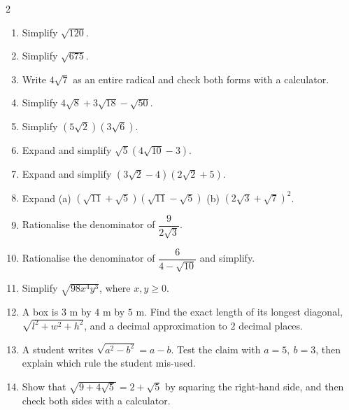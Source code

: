 \documentclass[11pt]{article}
\begin{document}
\begin{recapbox}
\begin{multicols}{2}
\small
\begin{enumerate}[leftmargin=*,itemsep=3pt]
  \item Simplify $\sqrt{120}$.
  \item Simplify $\sqrt{675}$.
  \item Write $4\sqrt7$ as an entire radical and check both forms with a calculator.
  \item Simplify $4\sqrt8+3\sqrt{18}-\sqrt{50}$.
  \item Simplify $(5\sqrt2)(3\sqrt6)$.
  \item Expand and simplify $\sqrt5\left(4\sqrt{10}-3\right)$.
  \item Expand and simplify $\left(3\sqrt2-4\right)\left(2\sqrt2+5\right)$.
  \item Expand (a) $\left(\sqrt{11}+\sqrt5\right)\left(\sqrt{11}-\sqrt5\right)$ \quad (b) $\left(2\sqrt3+\sqrt7\right)^2$.
  \item Rationalise the denominator of $\dfrac{9}{2\sqrt3}$.
  \item Rationalise the denominator of $\dfrac{6}{4-\sqrt{10}}$ and simplify.
  \item Simplify $\sqrt{98x^4y^3}$, where $x,y\ge0$.
  \item A box is $3$ m by $4$ m by $5$ m. Find the exact length of its longest diagonal, $\sqrt{l^2+w^2+h^2}$, and a decimal approximation to $2$ decimal places.
  \item A student writes $\sqrt{a^2-b^2}=a-b$. Test the claim with $a=5,\ b=3$, then explain which rule the student mis-used.
  \item Show that $\sqrt{9+4\sqrt5}=2+\sqrt5$ by squaring the right-hand side, and then check both sides with a calculator.
\end{enumerate}
\end{multicols}
\end{recapbox}
\end{document}

